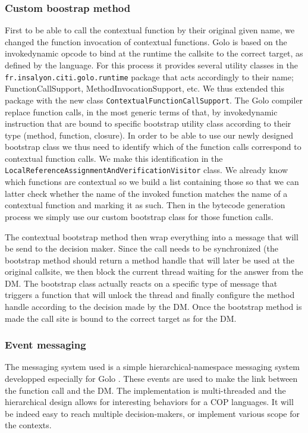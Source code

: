 \documentclass[a4paper]{article}
\begin{document}
\subsubsection{Custom boostrap method}
First to be able to call the contextual function by their original given name, we changed the function invocation of contextual functions. Golo is based on the invokedynamic opcode to bind at the runtime the callsite to the correct target, as defined by the language. For this process it provides several utility classes in the \lstinline|fr.insalyon.citi.golo.runtime| package that acts accordingly to their name; FunctionCallSupport, MethodInvocationSupport, etc. We thus extended this package with the new class \lstinline|ContextualFunctionCallSupport|. The Golo compiler replace function calls, in the most generic terms of that, by invokedynamic instruction that are bound to specific bootstrap utility class according to their type (method, function, closure). In order to be able to use our newly designed bootstrap class we thus need to identify which of the function calls correspond to contextual function calls. We make this identification in the \lstinline|LocalReferenceAssignmentAndVerificationVisitor| class. We already know which functions are contextual so we build a list containing those so that we can latter check whether the name of the invoked function matches the name of a contextual function and marking it as such. Then in the bytecode generation process we simply use our custom bootstrap class for those function calls.

The contextual bootstrap method then wrap everything into a message that will be send to the decision maker. Since the call needs to be synchronized (the bootstrap method should return a method handle that will later be used at the original callsite, we then block the current thread waiting for the answer from the DM. The bootstrap class actually reacts on a specific type of message that triggers a function that will unlock the thread and finally configure the method handle according to the decision made by the DM. Once the bootstrap method is made the call site is bound to the correct target as for the DM.

\subsubsection{Event messaging}
The messaging system used is a simple hierarchical-namespace messaging system developped especially for Golo \cite{flemouel_gololang-messaging_2013}. These events are used to make the link between the function call and the DM. The implementation is multi-threaded and the hierarchical design allows for interesting behaviors for a COP languages. It will be indeed easy to reach multiple decision-makers, or implement various scope for the contexts.
\end{document}
